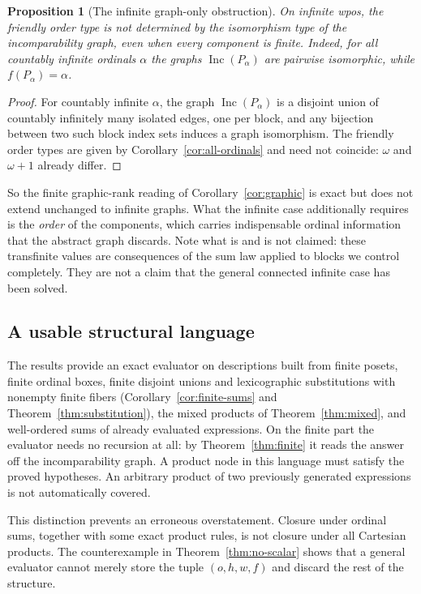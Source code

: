\documentclass[11pt,letterpaper]{article}
\newtheorem{proposition}[theorem]{Proposition}
\theoremstyle{definition}
\theoremstyle{remark}
\newcommand{\Inc}{\operatorname{Inc}}
\begin{document}
\begin{proposition}[The infinite graph-only obstruction]\label{prop:graph-obstruction}
On infinite wpos, the friendly order type is not determined by the
isomorphism type of the incomparability graph, even when every component is
finite. Indeed, for all countably infinite ordinals $\alpha$ the graphs
$\Inc(P_\alpha)$ are pairwise isomorphic, while $f(P_\alpha)=\alpha$.
\end{proposition}
\begin{proof}
For countably infinite $\alpha$, the graph $\Inc(P_\alpha)$ is a disjoint
union of countably infinitely many isolated edges, one per block, and any
bijection between two such block index sets induces a graph isomorphism.
The friendly order types are given by Corollary~\ref{cor:all-ordinals} and
need not coincide: $\omega$ and $\omega+1$ already differ.
\end{proof}

So the finite graphic-rank reading of Corollary~\ref{cor:graphic} is exact
but does not extend unchanged to infinite graphs. What the infinite case
additionally requires is the \emph{order} of the components, which carries
indispensable ordinal information that the abstract graph discards. Note
what is and is not claimed: these transfinite values are consequences of
the sum law applied to blocks we control completely. They are not a claim
that the general connected infinite case has been solved.

\subsection{A usable structural language}
The results provide an exact evaluator on descriptions built from finite
posets, finite ordinal boxes, finite disjoint unions and lexicographic
substitutions with nonempty finite fibers
(Corollary~\ref{cor:finite-sums} and Theorem~\ref{thm:substitution}), the
mixed products of Theorem~\ref{thm:mixed}, and well-ordered sums of already
evaluated expressions. On the finite part the evaluator needs no recursion
at all: by Theorem~\ref{thm:finite} it reads the answer off the
incomparability graph. A product node in this language must satisfy the
proved hypotheses. An arbitrary product of two previously generated
expressions is not automatically covered.

This distinction prevents an erroneous overstatement. Closure under
ordinal sums, together with some exact product rules, is not closure under
all Cartesian products. The counterexample in
Theorem~\ref{thm:no-scalar} shows that a general evaluator cannot merely
store the tuple $(o,h,w,f)$ and discard the rest of the structure.
\end{document}
